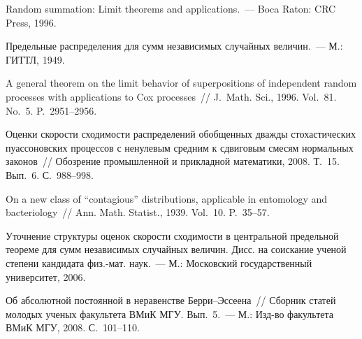 \begin{multicols}{2}
{{\begin{thebibliography}{99}
Random summation: Limit theorems and applications.~--- Boca Raton: CRC Press, 1996. %

Предельные распределения для сумм независимых случайных величин.~--- М.: ГИТТЛ, 1949. %


A general theorem on the limit behavior of superpositions of independent
random processes with applications to Cox processes~// J.\
Math. Sci., 1996. Vol.~81. No.~5. P.~2951--2956.

Оценки скорости сходимости распределений обобщенных дважды стохастических пуассоновских
процессов с ненулевым средним к сдвиговым смесям нормальных
законов~// Обозрение промышленной и прикладной математики, 2008.
Т.~15. Вып.~6. С.~988--998. %

On a new class of ``contagious'' distributions, applicable in
entomology and bacteriology~// Ann. Math. Statist., 1939. Vol.~10. P.~35--57. %

Уточнение структуры оценок скорости сходимости в центральной предельной теореме для сумм независимых
случайных величин. Дисс. на соискание ученой степени
кандидата физ.-мат. наук.~--- М.: Московский государственный
университет, 2006. %

\label{end\stat}

Об абсолютной постоянной в неравенстве Берри--Эссеена~// Сборник статей молодых ученых факультета ВМиК
МГУ. Вып.~5.~--- М.: Изд-во факультета ВМиК МГУ, 2008. С.~101--110. %


 \end{thebibliography}
}
}
\end{multicols}